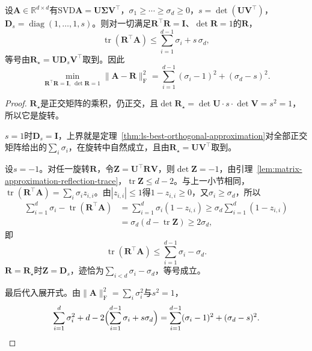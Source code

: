 \begin{theorem}[最佳旋转逼近]
\label{thm:matrix-approximation-best-rotation}
设$\bm A\in\mathbb R^{d\times d}$有SVD$\bm A=\bm U\bm\Sigma\bm V^\top$，$\sigma_1\geq\cdots\geq\sigma_d\geq0$，$s=\det(\bm U\bm V^\top)$，$\bm D_s=\operatorname{diag}(1,\ldots,1,s)$。则对一切满足$\bm R^\top\bm R=\bm I$、$\det\bm R=1$的$\bm R$，
\begin{equation}
 \operatorname{tr}(\bm R^\top\bm A)\leq\sum_{i=1}^{d-1}\sigma_i+s\,\sigma_d ,
 \label{eq:matrix-approximation-rotation-trace-bound}
\end{equation}
等号由$\bm R_\star=\bm U\bm D_s\bm V^\top$取到。因此
\begin{equation}
 \min_{\bm R^\top\bm R=\bm I,\ \det\bm R=1}\lVert\bm A-\bm R\rVert_{\mathrm F}^2
 =\sum_{i=1}^{d-1}(\sigma_i-1)^2+(\sigma_d-s)^2 .
 \label{eq:matrix-approximation-rotation-min-error}
\end{equation}
\end{theorem}
\begin{proof}
$\bm R_\star$是正交矩阵的乘积，仍正交，且$\det\bm R_\star=\det\bm U\cdot s\cdot\det\bm V=s^2=1$，所以它是旋转。

$s=1$时$\bm D_s=\bm I$，上界就是定理~\ref{thm:ls-best-orthogonal-approximation}对全部正交矩阵给出的$\sum_i\sigma_i$，在旋转中自然成立，且由$\bm R_\star=\bm U\bm V^\top$取到。

设$s=-1$。对任一旋转$\bm R$，令$\bm Z=\bm U^\top\bm R\bm V$，则$\det\bm Z=-1$，由引理~\ref{lem:matrix-approximation-reflection-trace}，$\operatorname{tr}\bm Z\leq d-2$。与上一小节相同，$\operatorname{tr}(\bm R^\top\bm A)=\sum_i\sigma_iz_{i,i}$。由$|z_{i,i}|\leq1$得$1-z_{i,i}\geq0$，又$\sigma_i\geq\sigma_d$，所以
\[
 \begin{aligned}
 \sum_{i=1}^d\sigma_i-\operatorname{tr}(\bm R^\top\bm A)
 &=\sum_{i=1}^d\sigma_i(1-z_{i,i})
 \geq\sigma_d\sum_{i=1}^d(1-z_{i,i})\\
 &=\sigma_d(d-\operatorname{tr}\bm Z)\geq2\sigma_d ,
 \end{aligned}
\]
即
\[
 \operatorname{tr}(\bm R^\top\bm A)\leq\sum_{i=1}^{d-1}\sigma_i-\sigma_d .
\]
$\bm R=\bm R_\star$时$\bm Z=\bm D_s$，迹恰为$\sum_{i<d}\sigma_i-\sigma_d$，等号成立。

最后代入展开式。由$\lVert\bm A\rVert_{\mathrm F}^2=\sum_i\sigma_i^2$与$s^2=1$，
\[
 \sum_{i=1}^d\sigma_i^2+d-2\Bigl(\sum_{i=1}^{d-1}\sigma_i+s\sigma_d\Bigr)
 =\sum_{i=1}^{d-1}(\sigma_i-1)^2+(\sigma_d-s)^2 .
\]
\end{proof}

